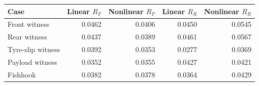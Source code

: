\begin{tabular}{lrrrr}\toprule
Case & Linear $R_F$ & Nonlinear $R_F$ & Linear $R_R$ & Nonlinear $R_R$\\\midrule
Front witness & 0.0462 & 0.0406 & 0.0450 & 0.0545\\
Rear witness & 0.0437 & 0.0389 & 0.0461 & 0.0567\\
Tyre-slip witness & 0.0392 & 0.0353 & 0.0277 & 0.0369\\
Payload witness & 0.0352 & 0.0355 & 0.0427 & 0.0421\\
Fishhook & 0.0382 & 0.0378 & 0.0364 & 0.0429\\
\bottomrule\end{tabular}